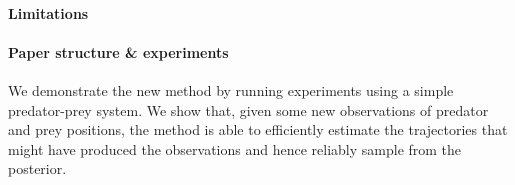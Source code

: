 \paragraph{Limitations}


\paragraph{Paper structure \& experiments}

We demonstrate the new method by running experiments using a simple predator-prey system. We show that, given some new observations of predator and prey positions, the method is able to efficiently estimate the trajectories that might have produced the observations and hence reliably sample from the posterior.


